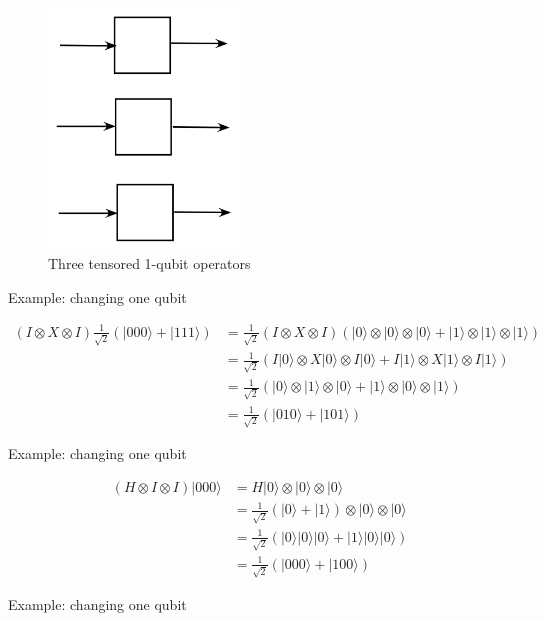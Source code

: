 \documentclass[main.tex]{subfiles}
\begin{document}
    \begin{figure}
        \centering
        \includegraphics[width=2in]{notes/figs/n07/20threequbit.png}
        \caption{Three tensored 1-qubit operators}
        \label{fig:20threequbit}
    \end{figure}
    
    Example: changing one qubit
    
    $$
    \begin{aligned}
    (I \otimes X \otimes I) \frac{1}{\sqrt{2}}(|000\rangle+|111\rangle) &=\frac{1}{\sqrt{2}}(I \otimes X \otimes I)(|0\rangle \otimes|0\rangle \otimes|0\rangle+|1\rangle \otimes|1\rangle \otimes|1\rangle) \\
    &=\frac{1}{\sqrt{2}}(I|0\rangle \otimes X|0\rangle \otimes I|0\rangle+I|1\rangle \otimes X|1\rangle \otimes I|1\rangle) \\
    &=\frac{1}{\sqrt{2}}(|0\rangle \otimes|1\rangle \otimes|0\rangle+|1\rangle \otimes|0\rangle \otimes|1\rangle) \\
    &=\frac{1}{\sqrt{2}}(|010\rangle+|101\rangle)
    \end{aligned}
    $$
    
    Example: changing one qubit
    
    $$
    \begin{aligned}
    (H \otimes I \otimes I)|000\rangle &=H|0\rangle \otimes|0\rangle \otimes|0\rangle \\
    &=\frac{1}{\sqrt{2}}(|0\rangle+|1\rangle) \otimes|0\rangle \otimes|0\rangle \\
    &=\frac{1}{\sqrt{2}}(|0\rangle|0\rangle|0\rangle+|1\rangle|0\rangle|0\rangle) \\
    &=\frac{1}{\sqrt{2}}(|000\rangle+|100\rangle)
    \end{aligned}
    $$
    
    Example: changing one qubit
    
\end{document}
